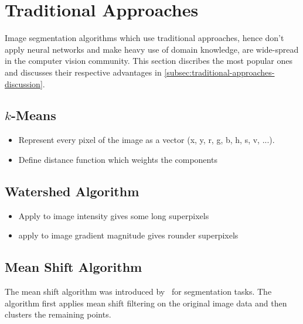\section{Traditional Approaches}\label{sec:traditional-approaches}

Image segmentation algorithms which use traditional approaches, hence don't
apply neural networks and make heavy use of domain knowledge, are wide-spread
in the computer vision community. This section discribes the most popular ones
and discusses their respective advantages in
\cref{subsec:traditional-approaches-discussion}.

\subsection{$k$-Means}\label{subsec:k-means}

\begin{itemize}
    \item Represent every pixel of the image as a vector (x, y, r, g, b, h, s,
          v, ...).
    \item Define distance function which weights the components
\end{itemize}


\subsection{Watershed Algorithm}\label{subsec:watershed}

\begin{itemize}
    \item Apply to image intensity gives some long superpixels
    \item apply to image gradient magnitude gives rounder superpixels
\end{itemize}



\subsection{Mean Shift Algorithm}\label{subsec:mean-shift}
The mean shift algorithm was introduced by~\cite{comaniciu2002mean} for
segmentation tasks. The algorithm first applies mean shift filtering on the
original image data and then clusters the remaining points.

